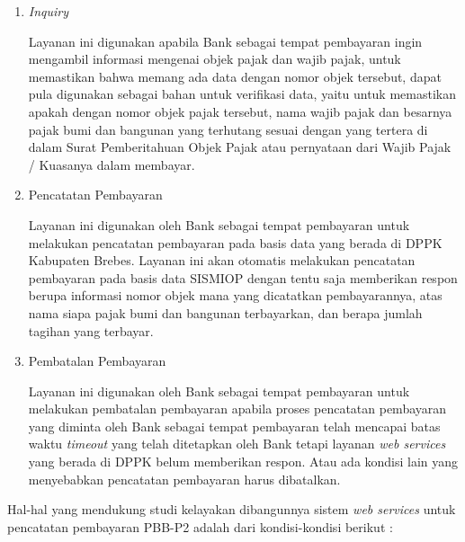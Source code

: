 \documentclass[pdftex,12pt, oneside]{article}
\begin{document}
\begin{enumerate}
  \item \textit{Inquiry}
  
  Layanan ini digunakan apabila Bank sebagai tempat pembayaran ingin mengambil informasi mengenai objek pajak dan wajib pajak, untuk memastikan bahwa memang ada data dengan nomor objek tersebut, dapat pula digunakan sebagai bahan untuk verifikasi data, yaitu untuk memastikan apakah dengan nomor objek pajak tersebut, nama wajib pajak dan besarnya pajak bumi dan bangunan yang terhutang sesuai dengan yang tertera di dalam Surat Pemberitahuan Objek Pajak atau pernyataan dari Wajib Pajak / Kuasanya dalam membayar.
  
  \item Pencatatan Pembayaran
  
  Layanan ini digunakan oleh Bank sebagai tempat pembayaran untuk melakukan pencatatan pembayaran pada basis data yang berada di DPPK Kabupaten Brebes. Layanan ini akan otomatis melakukan pencatatan pembayaran pada basis data SISMIOP dengan tentu saja memberikan respon berupa informasi nomor objek mana yang dicatatkan pembayarannya, atas nama siapa pajak bumi dan bangunan terbayarkan, dan berapa jumlah tagihan yang terbayar.
  
  \item Pembatalan Pembayaran
  
  Layanan ini digunakan oleh Bank sebagai tempat pembayaran untuk melakukan pembatalan pembayaran apabila proses pencatatan pembayaran yang diminta oleh Bank sebagai tempat pembayaran telah mencapai batas waktu \textit{timeout} yang telah ditetapkan oleh Bank tetapi layanan \textit{web services} yang berada di DPPK belum memberikan respon. Atau ada kondisi lain yang menyebabkan pencatatan pembayaran harus dibatalkan.
  
\end{enumerate}

Hal-hal yang mendukung studi kelayakan dibangunnya sistem \textit{web services} untuk pencatatan pembayaran PBB-P2 adalah dari kondisi-kondisi berikut :
\end{document}
